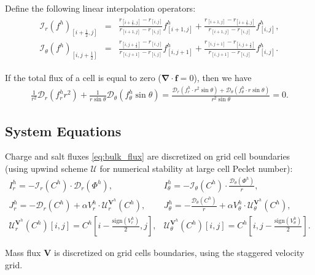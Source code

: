 \documentclass[10pt]{ijnam}
\newcommand{\sign}{\ensuremath{\mathrm{sign}}}
\newcommand{\pars}[1]{\left(#1\right)}
\newcommand{\half}{\frac{1}{2}}
\newcommand\bnabla{\boldsymbol{\nabla}}
\newcommand\bV{\boldsymbol{V}}
\newcommand\cI{\mathcal{I}}
\newcommand\cD{\mathcal{D}}
\begin{document}
Define the following linear interpolation operators:
\begin{eqnarray*}
\begin{array}{rcl}
\cI_r(f^h)_{\left[i+\half,j\right]} &=& 
\frac{r_{\left[i+\half,j\right]} - r_{\left[i,j\right]}}
{r_{\left[i+1,j\right]} - r_{\left[i,j\right]}} 
f^h_{\left[i+1,j\right]} 
+ 
\frac{r_{\left[i+1,j\right]} - r_{\left[i+\half,j\right]}}
{r_{\left[i+1,j\right]} - r_{\left[i,j\right]}}
f^h_{\left[i,j\right]},
\\
\cI_\theta(f^h)_{\left[i,j+\half\right]} &=& 
\frac{r_{\left[i,j+\half\right]} - r_{\left[i,j\right]}}
{r_{\left[i,j+1\right]} - r_{\left[i,j\right]}}
  f^h_{\left[i,j+1\right]} + 
\frac{ r_{\left[i,j+1\right]} - r_{\left[i,j+\half\right]}}
{r_{\left[i,j+1\right]} - r_{\left[i,j\right]}}
  f^h_{\left[i,j\right]}.
\end{array}
\end{eqnarray*}

If the total flux of a cell is equal to zero ($\bnabla \cdot \boldsymbol{f} = 0$), then we have
\begin{eqnarray*}
\frac{1}{r^2} \cD_r\pars{f^h_r r^2} + 
\frac{1}{r \sin\theta} \cD_\theta\pars{f^h_\theta \sin\theta} =
\frac{\cD_r\pars{f^h_r \cdot r^2 \sin\theta} + 
\cD_\theta\pars{f^h_\theta \cdot r \sin\theta}}{r^2 \sin\theta} = 0. 
\end{eqnarray*}

\subsection{System Equations} \label{sec:disc_equations}
Charge and salt fluxes \eqref{eq:bulk_flux} are discretized on grid cell boundaries 
(using upwind scheme $\mathcal{U}$ for numerical stability at large cell Peclet number):
\begin{eqnarray} \nonumber
I^h_r = -\cI_r(C^h) \cdot \cD_r(\varPhi^h), &
I^h_\theta = -\cI_\theta(C^h) \cdot \frac{\cD_\theta(\varPhi^h)}{r}, \\
J^h_r = -\cD_r(C^h) + \alpha V^h_r \cdot \mathcal{U}^{\bV^h}_r (C^h), &
J^h_\theta = -\frac{\cD_\theta(C^h)}{r} + \alpha V^h_\theta \cdot \mathcal{U}^{\bV^h}_\theta (C^h), 
\\ \nonumber
 \mathcal{U}^{\bV^h}_r(C^h)[i,j] = C^h\left[i-\frac{\sign(V^h_r)}{2}, j\right], &
 \mathcal{U}^{\bV^h}_\theta(C^h)[i,j] = C^h\left[i, j-\frac{\sign(V^h_\theta)}{2}\right]. 
\end{eqnarray}

Mass flux $\bV$ is discretized on grid cells boundaries, 
using the staggered velocity grid.
\end{document}
